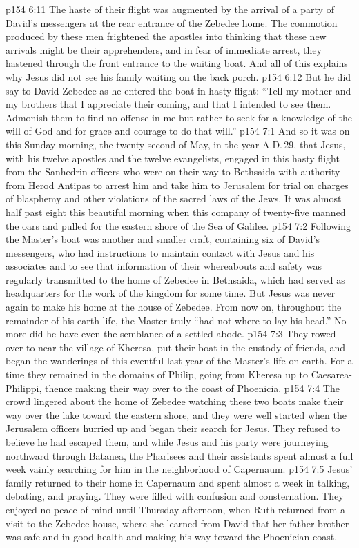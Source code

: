 \vs p154 6:11 The haste of their flight was augmented by the arrival of a party of David’s messengers at the rear entrance of the Zebedee home. The commotion produced by these men frightened the apostles into thinking that these new arrivals might be their apprehenders, and in fear of immediate arrest, they hastened through the front entrance to the waiting boat. And all of this explains why Jesus did not see his family waiting on the back porch.
\vs p154 6:12 But he did say to David Zebedee as he entered the boat in hasty flight: \textcolor{ubdarkred}{“Tell my mother and my brothers that I appreciate their coming, and that I intended to see them. Admonish them to find no offense in me but rather to seek for a knowledge of the will of God and for grace and courage to do that will.”}
\vs p154 7:1 And so it was on this Sunday morning, the twenty\hyp{}second of May, in the year A.D.\,29, that Jesus, with his twelve apostles and the twelve evangelists, engaged in this hasty flight from the Sanhedrin officers who were on their way to Bethsaida with authority from Herod Antipas to arrest him and take him to Jerusalem for trial on charges of blasphemy and other violations of the sacred laws of the Jews. It was almost half past eight this beautiful morning when this company of twenty\hyp{}five manned the oars and pulled for the eastern shore of the Sea of Galilee.
\vs p154 7:2 Following the Master’s boat was another and smaller craft, containing six of David’s messengers, who had instructions to maintain contact with Jesus and his associates and to see that information of their whereabouts and safety was regularly transmitted to the home of Zebedee in Bethsaida, which had served as headquarters for the work of the kingdom for some time. But Jesus was never again to make his home at the house of Zebedee. From now on, throughout the remainder of his earth life, the Master truly “had not where to lay his head.” No more did he have even the semblance of a settled abode.
\vs p154 7:3 They rowed over to near the village of Kheresa, put their boat in the custody of friends, and began the wanderings of this eventful last year of the Master’s life on earth. For a time they remained in the domains of Philip, going from Kheresa up to Caesarea\hyp{}Philippi, thence making their way over to the coast of Phoenicia.
\vs p154 7:4 \pc The crowd lingered about the home of Zebedee watching these two boats make their way over the lake toward the eastern shore, and they were well started when the Jerusalem officers hurried up and began their search for Jesus. They refused to believe he had escaped them, and while Jesus and his party were journeying northward through Batanea, the Pharisees and their assistants spent almost a full week vainly searching for him in the neighborhood of Capernaum.
\vs p154 7:5 Jesus’ family returned to their home in Capernaum and spent almost a week in talking, debating, and praying. They were filled with confusion and consternation. They enjoyed no peace of mind until Thursday afternoon, when Ruth returned from a visit to the Zebedee house, where she learned from David that her father\hyp{}brother was safe and in good health and making his way toward the Phoenician coast.
